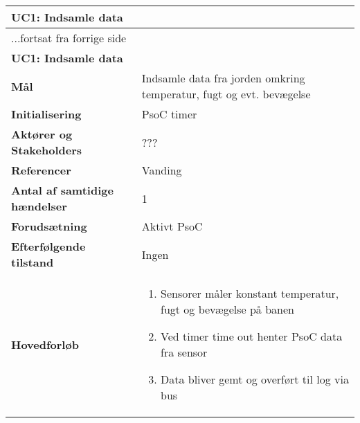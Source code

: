 \begin{center} \centering
	\begin{longtable}{|p{6cm}|p{8cm}|}  %
	\hline
		\multicolumn{2}{|l|}{\textbf{UC1: Indsamle data}} \\\hline %
		\endfirsthead
		
		\multicolumn{2}{l}{...fortsat fra forrige side} \\ \hline %
		\multicolumn{2}{|l|}{\textbf{UC1: Indsamle data}} \\\hline %
		\endhead	
		
		\textbf{Mål}								& Indsamle data fra jorden omkring temperatur, fugt og evt. bevægelse			\\\hline
		\textbf{Initialisering}					& PsoC timer			\\\hline
		\textbf{Aktører og Stakeholders}			& ???			\\\hline
		\textbf{Referencer}						& Vanding			\\\hline
		\textbf{Antal af samtidige hændelser}	& 1			\\\hline
		\textbf{Forudsætning}					& Aktivt PsoC		\\\hline
		\textbf{Efterfølgende tilstand}			& Ingen			\\\hline
		\textbf{Hovedforløb}					
			&\begin{enumerate}
	
				\item Sensorer måler konstant temperatur, fugt og bevægelse på banen
				
				\item Ved timer time out henter PsoC data fra sensor 
				
				\item Data bliver gemt og overført til log via bus
				
	
			\end{enumerate}\\\hline
	\end{longtable}
	\label{UC1} 
\end{center}

